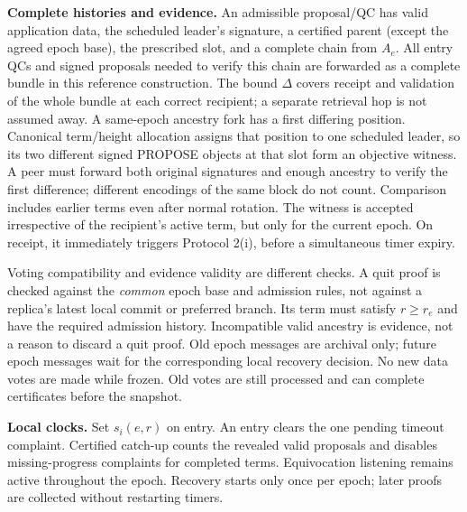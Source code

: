 \documentclass[10pt,a4paper]{article}
\begin{document}
\textbf{Complete histories and evidence.} An admissible proposal/QC has valid
application data, the scheduled leader's signature, a certified parent
(except the agreed epoch base), the prescribed slot, and a complete chain
from $A_e$. All entry QCs and signed proposals needed to verify this chain
are forwarded as a complete bundle in this reference construction.
The bound $\Delta$ covers receipt and validation of the whole bundle at
each correct recipient; a separate retrieval hop is not assumed away. A same-epoch ancestry fork has a first differing position. Canonical
term/height allocation assigns that position to one scheduled leader,
so its two different signed PROPOSE objects at that slot form an objective
witness. A peer must forward both original signatures and enough ancestry
to verify the first difference; different encodings of the same block do
not count. Comparison includes earlier terms even after normal rotation.
The witness is accepted irrespective of the recipient's active term,
but only for the current epoch. On receipt, it immediately triggers
Protocol 2(i), before a simultaneous timer expiry.

Voting compatibility and evidence validity are different checks. A quit
proof is checked against the \emph{common} epoch base and admission rules,
not against a replica's latest local commit or preferred branch. Its term
must satisfy $r\ge r_e$ and have the required admission history. Incompatible
valid ancestry is evidence, not a reason to discard a quit proof. Old epoch
messages are archival only; future epoch messages wait for the corresponding
local recovery decision. No new data votes are made while frozen. Old votes
are still processed and can complete certificates before the snapshot.

\textbf{Local clocks.} Set $s_i(e,r)$ on entry. An entry clears the one
pending timeout complaint. Certified catch-up counts the revealed valid
proposals and disables missing-progress complaints for completed terms.
Equivocation listening remains active throughout the epoch. Recovery starts
only once per epoch; later proofs are collected without restarting timers.
\end{document}
